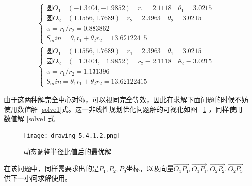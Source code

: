 \documentclass{cumcmthesis1}
\begin{document}
\begin{equation}
\begin{aligned}
    \begin{cases}
        \text{圆}O_1 \quad (-1.3404,-1.9852) \quad r_1=2.1118 \quad \theta_1=3.0215\\
        \text{圆}O_2 \quad (1.1556,1.7689) \quad r_2=2.3963 \quad \theta_2=3.0215\\
        \alpha=r_1/r_2=0.883862\\
        S_min=\theta_1 r_1+\theta_2 r_2=13.62122415
    \end{cases}
\end{aligned}
\label{solve1}
\end{equation}
\begin{align}
    \begin{cases}
        \text{圆}O_1 \quad (1.1556,1.7689) \quad r_1=2.3963 \quad \theta_1=3.0215\\
        \text{圆}O_2 \quad (-1.3404,-1.9852) \quad r_2=2.1118 \quad \theta_2=3.0215\\
        \alpha=r_1/r_2=1.131396\\
        S_min=\theta_1 r_1+\theta_2 r_2=13.62122415
    \end{cases}
\end{align}

由于这两种解完全中心对称，可以视同完全等效，因此在求解下面问题的时候不妨使用数值解
\eqref{solve1}式。这一非线性规划优化问题解的可视化如图 ~\ref{solving}   
，同样使用数值解
\eqref{solve1}式
\begin{figure}[hp]
    \caption{动态调整半径比值后的最优解}
    \centering    
    \texttt{[image: drawing\_5.4.1.2.png]}
    \label{solving}
\end{figure}
\par
在该问题中，同样需要求出的是$P_1,P_2,P_3$坐标，以及向量$\overrightarrow{O_1 P_1}, \overrightarrow{O_1 P_3},\overrightarrow{O_2 P_2},\overrightarrow{O_2 P_3}$供下一小问求解使用。
\end{document}

